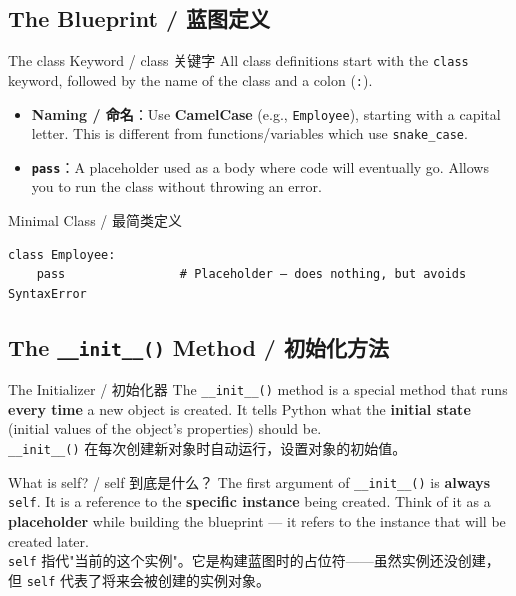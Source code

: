 \documentclass[11pt,a4paper]{article}
\begin{document}
\subsection{The Blueprint / 蓝图定义}

\begin{concept}{The class Keyword / class 关键字}
    All class definitions start with the \texttt{class} keyword, followed by the name of the class and a colon (\texttt{:}).
    \begin{itemize}[itemsep=0.3em]
        \item \textbf{Naming / 命名}：Use \textbf{CamelCase} (e.g., \texttt{Employee}), starting with a capital letter. This is different from functions/variables which use \texttt{snake\_case}.
        \item \textbf{\texttt{pass}}：A placeholder used as a body where code will eventually go. Allows you to run the class without throwing an error.
    \end{itemize}
\end{concept}

\begin{examplebox}{Minimal Class / 最简类定义}
\begin{lstlisting}
class Employee:
    pass                # Placeholder — does nothing, but avoids SyntaxError
\end{lstlisting}
\end{examplebox}

\subsection{The \texttt{\_\_init\_\_()} Method / 初始化方法}

\begin{concept}{The Initializer / 初始化器}
    The \texttt{\_\_init\_\_()} method is a special method that runs \textbf{every time} a new object is created. It tells Python what the \textbf{initial state} (initial values of the object's properties) should be. \\
    \texttt{\_\_init\_\_()} 在每次创建新对象时自动运行，设置对象的初始值。
\end{concept}

\begin{warning}{What is self? / self 到底是什么？}
    The first argument of \texttt{\_\_init\_\_()} is \textbf{always} \texttt{self}. It is a reference to the \textbf{specific instance} being created. Think of it as a \textbf{placeholder} while building the blueprint — it refers to the instance that will be created later. \\
    \texttt{self} 指代"当前的这个实例"。它是构建蓝图时的占位符——虽然实例还没创建，但 \texttt{self} 代表了将来会被创建的实例对象。
\end{warning}
\end{document}
